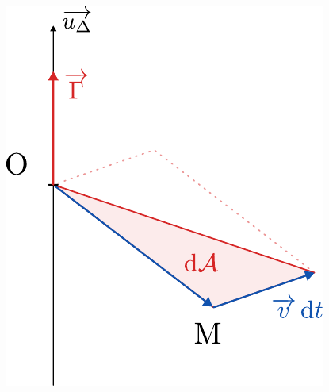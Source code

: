 \documentclass[a4paper, 10pt, final, garamond]{book}
\begin{document}
\begin{enumerate}[label=\sqenumi]
\begin{isd}
\begin{center}
{			}{
				\includegraphics[scale=.6]{dAmomcin}
			}
		\end{center}
	\end{isd}

\end{enumerate}
\end{document}
